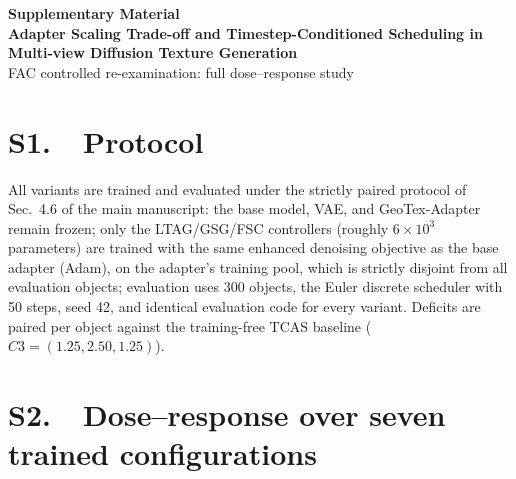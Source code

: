 \documentclass[10pt]{article}
\begin{document}
\begin{center}
{\Large\bfseries Supplementary Material}\\[4pt]
{\large\bfseries Adapter Scaling Trade-off and Timestep-Conditioned Scheduling in Multi-view Diffusion Texture Generation}\\[4pt]
{\large FAC controlled re-examination: full dose--response study}
\end{center}

\section{S1.\ \ Protocol}
All variants are trained and evaluated under the strictly paired protocol of Sec.~4.6 of the main manuscript: the base model, VAE, and GeoTex-Adapter remain frozen; only the LTAG/GSG/FSC controllers (roughly $6\times10^{3}$ parameters) are trained with the same enhanced denoising objective as the base adapter (Adam), on the adapter's training pool, which is strictly disjoint from all evaluation objects; evaluation uses 300 objects, the Euler discrete scheduler with 50 steps, seed 42, and identical evaluation code for every variant. Deficits are paired per object against the training-free TCAS baseline ($C3=(1.25,2.50,1.25)$).

\section{S2.\ \ Dose--response over seven trained configurations}
\end{document}
